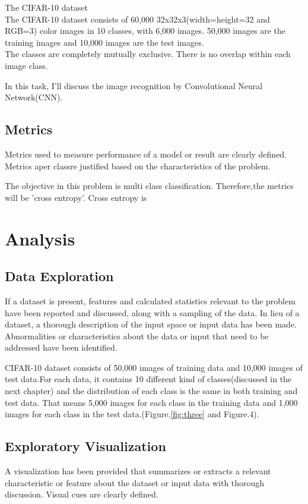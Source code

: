 \documentclass[a4paper,10pt,fleqn]{article}
\begin{document}
{\Large The CIFAR-10 dataset}\\
The CIFAR-10 dataset consists of 60,000 32x32x3(width=height=32 and RGB=3) color images in 10 classes, with 6,000 images. 50,000 images are the training images and 10,000 images are the test images.\\
The classes are completely mutually exclusive. There is no overlap within each image class.

In this task, I'll discuss the image recognition by Convolutional Neural Network(CNN).





\subsection{Metrics}
Metrics used to measure performance of a model or result are clearly defined. Metrics aper classre justified based on the characteristics of the problem.


The objective in this problem is multi class classification. Therefore,the metrics will be 'cross entropy'.
Cross entropy is 


\section{Analysis}
\subsection{Data Exploration}
If a dataset is present, features and calculated statistics relevant to the problem have been reported and discussed, along with a sampling of the data. In lieu of a dataset, a thorough description of the input space or input data has been made. Abnormalities or characteristics about the data or input that need to be addressed have been identified.


CIFAR-10 dataset consists of 50,000 images of training data and 10,000 images of test data.For each data, it contains 10 different kind of classes(discussed in the next chapter) and the distribution of each class is the same in both training and test data. That means 5,000 images for each class in the training data and 1,000 images for each class in the test data.(Figure.\ref{fig:three} and Figure.4). 


\subsection{Exploratory Visualization}
A visualization has been provided that summarizes or extracts a relevant characteristic or feature about the dataset or input data with thorough discussion. Visual cues are clearly defined.
\end{document}
